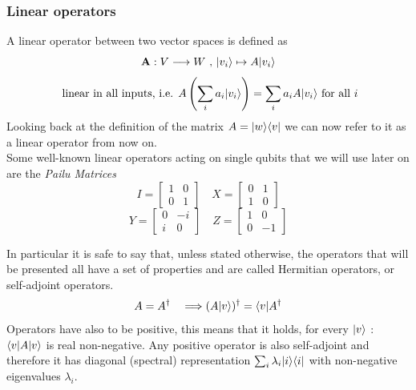 	\subsubsection*{Linear operators}
	A linear operator between two vector spaces is defined as 
	$$ \mathbf{A}: V\longrightarrow W \text{  ,  }|v_i \rangle\mapsto A|v_i \rangle$$
	$$ \text{ linear in all inputs, i.e.  }  A\left( \sum_i a_i|v_i \rangle\right) = \sum_i a_i A|v_i \rangle \text{  for all } i $$ 
	Looking back at the definition of the matrix $ A = |w \rangle\langle v|$ we can now refer to it as a linear operator from now on. \\
	Some well-known linear operators acting on single qubits that we will use later on are the \textit{Pailu Matrices}
	$$ I = \begin{bmatrix} 1 & 0 \\ 0 & 1 \end{bmatrix}	 \quad   X = \begin{bmatrix} 0 & 1 \\ 1 & 0 \end{bmatrix}$$
	$$ Y= \begin{bmatrix} 0 & -i \\ i & 0 \end{bmatrix}	 \quad   Z = \begin{bmatrix} 1 & 0 \\ 0 & -1 \end{bmatrix}$$
	
	In particular it is safe to say that, unless stated otherwise, the operators that will be presented all have a set of properties and are called Hermitian operators, or self-adjoint operators.\\
	$$ A = A^{\dagger} \quad \Longrightarrow (A|v \rangle)^{\dagger} = \langle v|A^{\dagger} $$ 
	Operators have also to be positive, this means that it holds, for every $|v \rangle$ : $\langle v|A|v \rangle$ is real non-negative. Any positive operator is also self-adjoint and therefore it has diagonal (spectral) representation $\sum_i \lambda_i |i\rangle\langle i|$ with non-negative eigenvalues $\lambda_i$.\\
	
